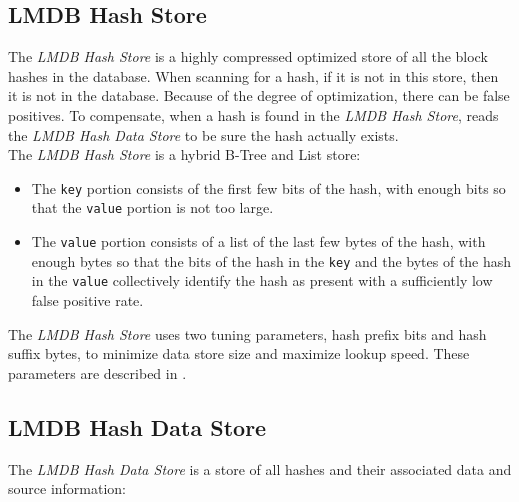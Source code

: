 \documentclass[11pt,fleqn]{article} %
\begin{document}
\subsection{LMDB Hash Store}
The \textit{LMDB Hash Store} is a highly compressed optimized store of all the block hashes in the database.  When scanning for a hash, if it is not in this store, then it is not in the database.  Because of the degree of optimization, there can be false positives.  To compensate, when a hash is found in the \textit{LMDB Hash Store}, \hdb reads the \textit{LMDB Hash Data Store} to be sure the hash actually exists.\\

The \textit{LMDB Hash Store} is a hybrid B-Tree and List store:
\begin{itemize}
\item The \verb+key+ portion consists of the first few bits of the hash, with enough bits so that the \verb+value+ portion is not too large.
\item The \verb+value+ portion consists of a list of the last few bytes of the hash, with enough bytes so that the bits of the hash in the \verb+key+ and the bytes of the hash in the \verb+value+ collectively identify the hash as present with a sufficiently low false positive rate.
\end{itemize}

The \textit{LMDB Hash Store} uses two tuning parameters, hash prefix bits and hash suffix bytes, to minimize data store size and maximize lookup speed.  These parameters are described in \textbf{}.\\


\subsection{LMDB Hash Data Store}
The \textit{LMDB Hash Data Store} is a store of all hashes and their associated data and source information:
\end{document}
